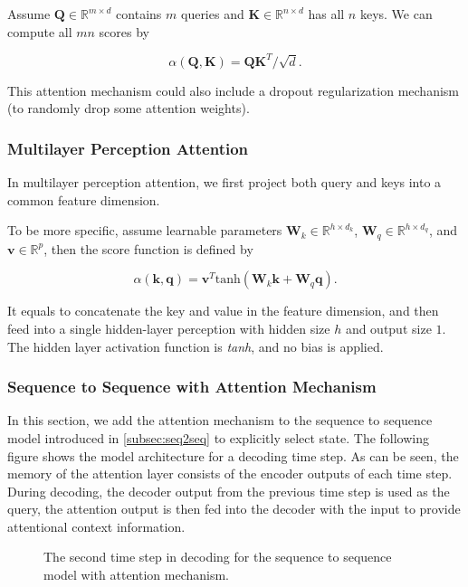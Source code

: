 Assume $\mathbf Q\in\mathbb R^{m\times d}$ contains $m$ queries and $\mathbf K\in\mathbb R^{n\times d}$ has all $n$ keys. We can compute all $mn$ scores by

$$\alpha(\mathbf Q, \mathbf K) = \mathbf Q \mathbf K^T /\sqrt{d}.$$

This attention mechanism could also include a dropout regularization mechanism (to randomly drop some attention weights).

\subsubsection{Multilayer Perception Attention}

In multilayer perception attention, we first project both query and keys into a common feature dimension.

To be more specific, assume learnable parameters $\mathbf W_k\in\mathbb R^{h\times d_k}$, $\mathbf W_q\in\mathbb R^{h\times d_q}$, and $\mathbf v\in\mathbb R^{p}$, then the score function is defined by

$$\alpha(\mathbf k, \mathbf q) = \mathbf v^T \text{tanh}(\mathbf W_k \mathbf k + \mathbf W_q\mathbf q). $$

It equals to concatenate the key and value in the feature dimension, and then feed into a single hidden-layer perception with hidden size $h$ and output size $1$. The hidden layer activation function is \textit{tanh}, and no bias is applied.

\subsubsection{Sequence to Sequence with Attention Mechanism}

In this section, we add the attention mechanism to the sequence to sequence model introduced in \cref{subsec:seq2seq} to explicitly select state. The following figure shows the model architecture for a decoding time step. As can be seen, the memory of the attention layer consists of the encoder outputs of each time step. During decoding, the decoder output from the previous time step is used as the query, the attention output is then fed into the decoder with the input to provide attentional context information.

\begin{figure}[hpt]
	\centering
	
	\caption{The second time step in decoding for the sequence to sequence model with attention mechanism.}
	\label{fig:seq2seq_attention}
\end{figure}

